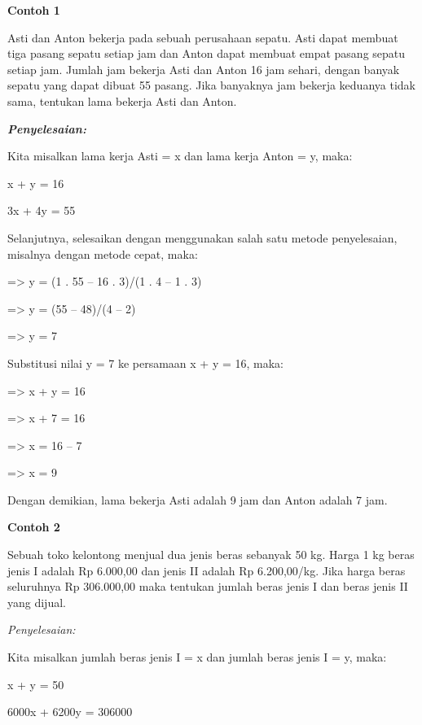 \documentclass[11pt,fleqn]{book} %
\begin{document}
\begin{myEnumerate}
\begin{itemize}
		\noindent 
		\textbf{Contoh 1} \par
		\noindent 
		Asti dan Anton bekerja pada sebuah perusahaan sepatu. Asti dapat membuat tiga pasang sepatu setiap jam dan Anton dapat membuat empat pasang sepatu setiap jam. Jumlah jam bekerja Asti dan Anton 16 jam sehari, dengan banyak sepatu yang dapat dibuat 55 pasang. Jika banyaknya jam bekerja keduanya tidak sama, tentukan lama bekerja Asti dan Anton. \par
		\noindent 
		\textbf{\textit{Penyelesaian:}} \par
		\noindent 
		Kita misalkan lama kerja Asti = x dan lama kerja Anton = y, maka: \par
		\noindent 
		x + y = 16 \par
		\noindent 
		3x + 4y = 55 \par
		\noindent 
		Selanjutnya, selesaikan dengan menggunakan salah satu metode penyelesaian, misalnya dengan $  $metode cepat, maka: \par
		\noindent 
		=> y = (1 . 55 – 16 . 3)/(1 . 4 – 1 . 3) \par
		\noindent 
		=> y = (55 – 48)/(4 – 2) \par
		\noindent 
		=> y = 7 \par
		\noindent 
		Substitusi nilai y = 7 ke persamaan x + y = 16, maka: \par
		\noindent 
		=> x + y = 16 \par
		\noindent 
		=> x + 7 = 16 \par
		\noindent 
		=> x = 16 – 7 \par
		\noindent 
		=> x = 9 \par
		\noindent 
		Dengan demikian, lama bekerja Asti adalah 9 jam dan Anton adalah 7 jam. \par
		\vspace{12pt}
		\noindent 
		\textbf{Contoh 2} \par
		\noindent 
		Sebuah toko kelontong menjual dua jenis beras sebanyak 50 kg. Harga 1 kg beras jenis I adalah Rp 6.000,00 dan jenis II adalah Rp 6.200,00/kg. Jika harga beras seluruhnya Rp 306.000,00 maka tentukan jumlah beras jenis I dan beras jenis II yang dijual. \par
		\noindent 
		\textit{Penyelesaian:} \par
		\noindent 
		Kita misalkan jumlah beras jenis I = x dan jumlah beras jenis I = y, maka: \par
		\noindent 
		x + y = 50 \par
		\noindent 
		6000x + 6200y = 306000 \par

\end{itemize}
\end{myEnumerate}
\end{document}
